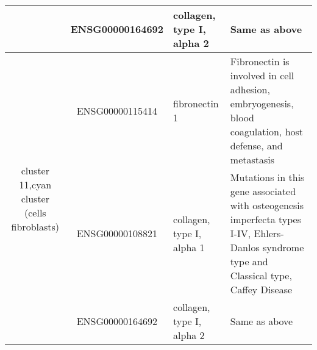 \begin{table}
\begin{center}
\begin{tabular}{|c|c|p{1.9in}|p{2.5in}|}
					      & ENSG00000164692 & collagen, type I, alpha 2 & Same as above \\
 \hline
 \multirow{3}{4em}{cluster 11,cyan cluster (cells fibroblasts)} & ENSG00000115414 & fibronectin 1 & Fibronectin is involved in cell adhesion, embryogenesis, blood coagulation, host defense, and metastasis \\
 					      & ENSG00000108821 & collagen, type I, alpha 1 & Mutations in this gene associated with osteogenesis imperfecta types I-IV, Ehlers-Danlos syndrome type and Classical type, Caffey Disease \\
					      & ENSG00000164692 & collagen, type I, alpha 2 & Same as above \\
\hline		
 \end{tabular}
 \end{center}
\end{table}


